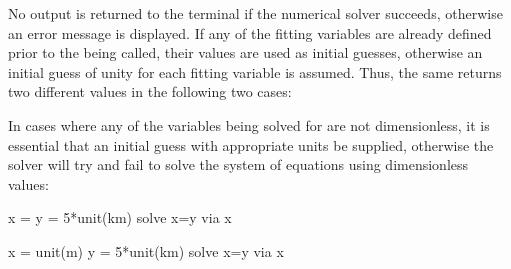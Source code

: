 \vspace{3mm}
\newline
{}\newline
{}\newline
{}\newline
{}
\vspace{3mm}

\noindent No output is returned to the terminal if the numerical solver
succeeds, otherwise an error message is displayed. If any of the fitting
variables are already defined prior to the  being called, their
values are used as initial guesses, otherwise an initial guess of unity for
each fitting variable is assumed. Thus, the same  returns two
different values in the following two cases:

\vspace{3mm}
\newline
{}\newline
{}\newline
{}\newline
{}\newline
{}\newline
{}\newline
{}
\vspace{3mm}

\noindent In cases where any of the variables being solved for are not
dimensionless, it is essential that an initial guess with appropriate units be
supplied, otherwise the solver will try and fail to solve the system of
equations using dimensionless values:

\begin{dontdo}
x =\newline
y = 5*unit(km)\newline
solve x=y via x
\end{dontdo}

\begin{dodo}
x = unit(m)\newline
y = 5*unit(km)\newline
solve x=y via x
\end{dodo}

